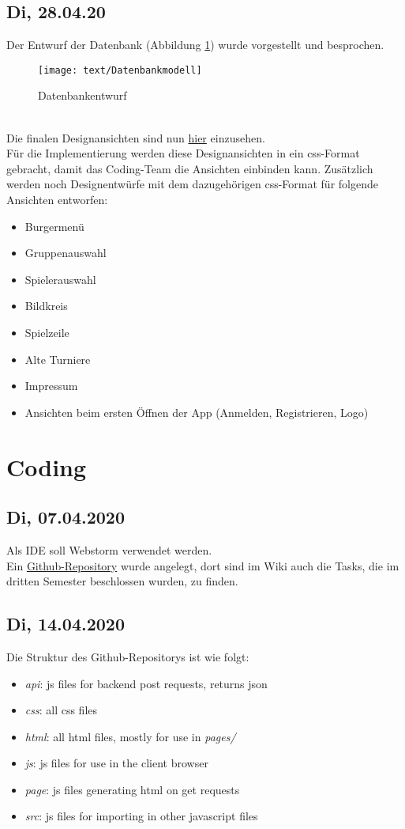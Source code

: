 \subsection{Di, 28.04.20}
Der Entwurf der Datenbank (Abbildung \ref{DB}) wurde vorgestellt und besprochen.
\begin{figure}[h!]
	\centering
	\texttt{[image: text/Datenbankmodell]}
	\caption{Datenbankentwurf}
	\label{DB}	
\end{figure}
\\Die finalen Designansichten sind nun \href{https://studentdhbwmannheimde-my.sharepoint.com/:f:/g/personal/s181108_student_dhbw-mannheim_de/Ek6DMqY0oCdFnB_9TndCsqAB3wNP20j2XAipOnYleT43Vw?e=0DY5WZ}{hier} einzusehen.
\\Für die Implementierung werden diese Designansichten in ein css-Format gebracht, damit das Coding-Team die Ansichten einbinden kann. Zusätzlich werden noch Designentwürfe mit dem dazugehörigen css-Format für folgende Ansichten entworfen:
\begin{itemize}
	\item Burgermenü
	\item Gruppenauswahl
	\item Spielerauswahl
	\item Bildkreis
	\item Spielzeile
	\item Alte Turniere
	\item Impressum
	\item Ansichten beim ersten Öffnen der App (Anmelden, Registrieren, Logo)
\end{itemize}



\newpage
\section{Coding}
\subsection{Di, 07.04.2020}
Als IDE soll Webstorm verwendet werden.\\
Ein \href{https://github.com/DavidRisch/kicker}{Github-Repository} wurde angelegt, dort sind im Wiki auch die Tasks, die im dritten Semester beschlossen wurden, zu finden.
\subsection{Di, 14.04.2020}
Die Struktur des Github-Repositorys ist wie folgt:
	\begin{itemize}
		\item \textit{api}: js files for backend post requests, returns json
		\item \textit{css}: all css files
		\item \textit{html}: all html files, mostly for use in \textit{pages/}
		\item \textit{js}: js files for use in the client browser
		\item \textit{page}: js files generating html on get requests
		\item \textit{src}: js files for importing in other javascript files
		
	\end{itemize}
